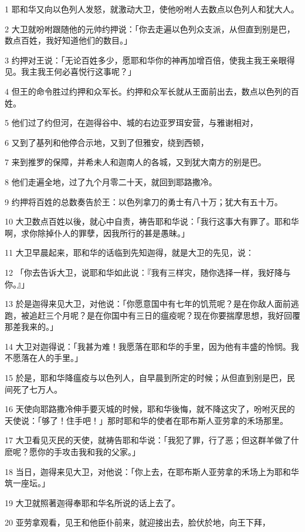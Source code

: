 \par 1 耶和华又向以色列人发怒，就激动大卫，使他吩咐人去数点以色列人和犹大人。
\par 2 大卫就吩咐跟随他的元帅约押说：「你去走遍以色列众支派，从但直到别是巴，数点百姓，我好知道他们的数目。」
\par 3 约押对王说：「无论百姓多少，愿耶和华你的神再加增百倍，使我主我王亲眼得见。我主我王何必喜悦行这事呢？」
\par 4 但王的命令胜过约押和众军长。约押和众军长就从王面前出去，数点以色列的百姓。
\par 5 他们过了约但河，在迦得谷中、城的右边亚罗珥安营，与雅谢相对，
\par 6 又到了基列和他停合示地，又到了但雅安，绕到西顿，
\par 7 来到推罗的保障，并希未人和迦南人的各城，又到犹大南方的别是巴。
\par 8 他们走遍全地，过了九个月零二十天，就回到耶路撒冷。
\par 9 约押将百姓的总数奏告於王：以色列拿刀的勇士有八十万；犹大有五十万。
\par 10 大卫数点百姓以後，就心中自责，祷告耶和华说：「我行这事大有罪了。耶和华啊，求你除掉仆人的罪孽，因我所行的甚是愚昧。」
\par 11 大卫早晨起来，耶和华的话临到先知迦得，就是大卫的先见，说：
\par 12 「你去告诉大卫，说耶和华如此说：『我有三样灾，随你选择一样，我好降与你。』」
\par 13 於是迦得来见大卫，对他说：「你愿意国中有七年的饥荒呢？是在你敌人面前逃跑，被追赶三个月呢？是在你国中有三日的瘟疫呢？现在你要揣摩思想，我好回覆那差我来的。」
\par 14 大卫对迦得说：「我甚为难！我愿落在耶和华的手里，因为他有丰盛的怜悯。我不愿落在人的手里。」
\par 15 於是，耶和华降瘟疫与以色列人，自早晨到所定的时候；从但直到别是巴，民间死了七万人。
\par 16 天使向耶路撒冷伸手要灭城的时候，耶和华後悔，就不降这灾了，吩咐灭民的天使说：「够了！住手吧！」那时耶和华的使者在耶布斯人亚劳拿的禾场那里。
\par 17 大卫看见灭民的天使，就祷告耶和华说：「我犯了罪，行了恶；但这群羊做了什麽呢？愿你的手攻击我和我的父家。」
\par 18 当日，迦得来见大卫，对他说：「你上去，在耶布斯人亚劳拿的禾场上为耶和华筑一座坛。」
\par 19 大卫就照著迦得奉耶和华名所说的话上去了。
\par 20 亚劳拿观看，见王和他臣仆前来，就迎接出去，脸伏於地，向王下拜，
